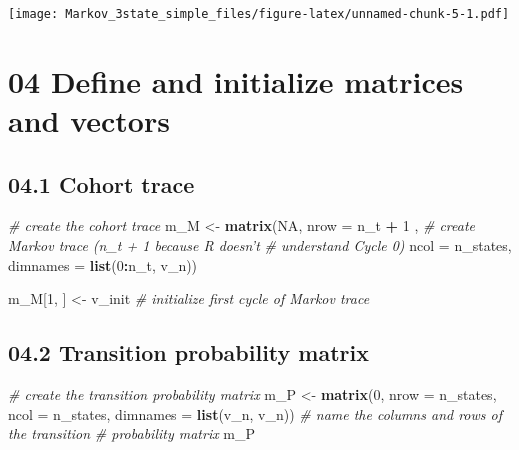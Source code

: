 \documentclass[
]{article}
\newenvironment{Shaded}{\begin{snugshade}}{\end{snugshade}}
\newcommand{\CommentTok}[1]{\textcolor[rgb]{0.56,0.35,0.01}{\textit{#1}}}
\newcommand{\DataTypeTok}[1]{\textcolor[rgb]{0.13,0.29,0.53}{#1}}
\newcommand{\DecValTok}[1]{\textcolor[rgb]{0.00,0.00,0.81}{#1}}
\newcommand{\KeywordTok}[1]{\textcolor[rgb]{0.13,0.29,0.53}{\textbf{#1}}}
\newcommand{\NormalTok}[1]{#1}
\newcommand{\OperatorTok}[1]{\textcolor[rgb]{0.81,0.36,0.00}{\textbf{#1}}}
\newcommand{\OtherTok}[1]{\textcolor[rgb]{0.56,0.35,0.01}{#1}}
\newcommand{\StringTok}[1]{\textcolor[rgb]{0.31,0.60,0.02}{#1}}
\begin{document}
\texttt{[image: Markov\_3state\_simple\_files/figure-latex/unnamed-chunk-5-1.pdf]}

\hypertarget{define-and-initialize-matrices-and-vectors}{%
\section{04 Define and initialize matrices and
vectors}\label{define-and-initialize-matrices-and-vectors}}

\hypertarget{cohort-trace}{%
\subsection{04.1 Cohort trace}\label{cohort-trace}}

\begin{Shaded}
\begin{Highlighting}[]
\CommentTok{# create the cohort trace}
\NormalTok{m_M <-}\StringTok{ }\KeywordTok{matrix}\NormalTok{(}\OtherTok{NA}\NormalTok{, }
              \DataTypeTok{nrow =}\NormalTok{ n_t }\OperatorTok{+}\StringTok{ }\DecValTok{1}\NormalTok{ ,  }\CommentTok{# create Markov trace (n_t + 1 because R doesn't }
                                \CommentTok{# understand Cycle 0)}
              \DataTypeTok{ncol =}\NormalTok{ n_states, }
              \DataTypeTok{dimnames =} \KeywordTok{list}\NormalTok{(}\DecValTok{0}\OperatorTok{:}\NormalTok{n_t, v_n))}

\NormalTok{m_M[}\DecValTok{1}\NormalTok{, ] <-}\StringTok{ }\NormalTok{v_init              }\CommentTok{# initialize first cycle of Markov trace}
\end{Highlighting}
\end{Shaded}

\hypertarget{transition-probability-matrix}{%
\subsection{04.2 Transition probability
matrix}\label{transition-probability-matrix}}

\begin{Shaded}
\begin{Highlighting}[]
\CommentTok{# create the transition probability matrix}
\NormalTok{m_P  <-}\StringTok{ }\KeywordTok{matrix}\NormalTok{(}\DecValTok{0}\NormalTok{,}
               \DataTypeTok{nrow =}\NormalTok{ n_states, }\DataTypeTok{ncol =}\NormalTok{ n_states,}
               \DataTypeTok{dimnames =} \KeywordTok{list}\NormalTok{(v_n, v_n))  }\CommentTok{# name the columns and rows of the transition }
                                           \CommentTok{# probability matrix}
\NormalTok{m_P}
\end{Highlighting}
\end{Shaded}
\end{document}
